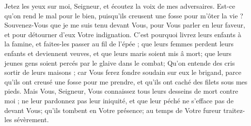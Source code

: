 Jetez les yeux sur moi, Seigneur, et écoutez la voix de mes adversaires.
Est-ce qu'on rend le mal pour le bien, puisqu'ils creusent une fosse pour m'ôter la vie ? Souvenez-Vous que je me suis tenu devant Vous, pour Vous parler en leur faveur, et pour détourner d'eux Votre indignation.
C'est pourquoi livrez leurs enfants à la famine, et faites-les passer au fil de l'épée ; que leurs femmes perdent leurs enfants et deviennent veuves, et que leurs maris soient mis â mort; que leurs jeunes gens soient percés par le glaive dans le combat;
Qu'on entende des cris sortir de leurs maisons ; car Vous ferez fondre soudain sur eux le brigand, parce qu'ils ont creusé une fosse pour me prendre, et qu'ils ont caché des filets sous mes pieds.
Mais Vous, Seigneur, Vous connaissez tous leurs desseins de mort contre moi ; ne leur pardonnez pas leur iniquité, et que leur péché ne s'efface pas de devant Vous; qu'ils tombent en Votre présence; au temps de Votre fureur traitez-les sévèrement.